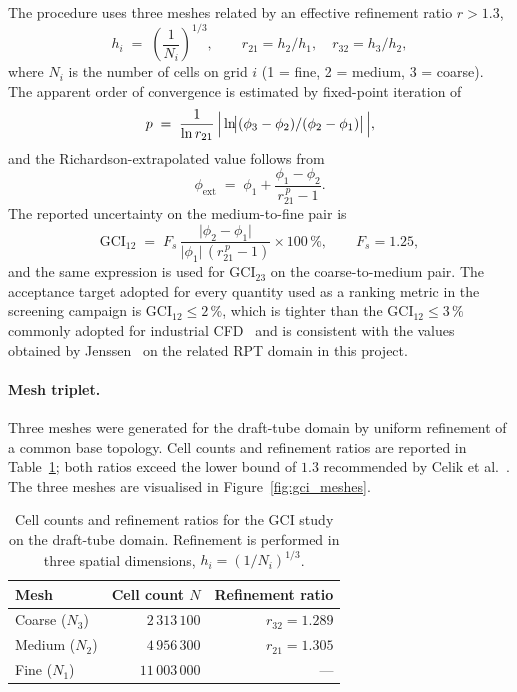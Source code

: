 The procedure uses three meshes related by an effective refinement ratio $r > 1.3$,
\begin{equation}
h_i \;=\; \!\left(\frac{1}{N_i}\right)^{1/3}, \qquad
r_{21} = h_2 / h_1, \quad r_{32} = h_3 / h_2,
\label{eq:GCI_h_r}
\end{equation}
where $N_i$ is the number of cells on grid $i$ (1 = fine, 2 = medium, 3 = coarse). The apparent order of convergence is estimated by fixed-point iteration of
\begin{equation}
p \;=\; \frac{1}{\ln r_{21}} \,\Bigl|\,\ln\!\bigl|(\phi_3 - \phi_2)/(\phi_2 - \phi_1)\bigr|\,\Bigr|,
\label{eq:GCI_p}
\end{equation}
and the Richardson-extrapolated value follows from
\begin{equation}
\phi_{\mathrm{ext}} \;=\; \phi_1 + \frac{\phi_1 - \phi_2}{r_{21}^{\,p} - 1}.
\label{eq:GCI_extrap}
\end{equation}
The reported uncertainty on the medium-to-fine pair is
\begin{equation}
\mathrm{GCI}_{12} \;=\; F_s\,\frac{\bigl|\phi_2 - \phi_1\bigr|}{\bigl|\phi_1\bigr|\,(r_{21}^{\,p} - 1)} \times 100\,\%, \qquad F_s = 1.25,
\label{eq:GCI_def}
\end{equation}
and the same expression is used for $\mathrm{GCI}_{23}$ on the coarse-to-medium pair. The acceptance target adopted for every quantity used as a ranking metric in the screening campaign is $\mathrm{GCI}_{12} \leq 2\,\%$, which is tighter than the $\mathrm{GCI}_{12} \leq 3\,\%$ commonly adopted for industrial CFD~\cite{Celik2008} and is consistent with the values obtained by Jenssen~\cite{Jenssen2020} on the related RPT domain in this project.

\paragraph{Mesh triplet.}
Three meshes were generated for the draft-tube domain by uniform refinement of a common base topology. Cell counts and refinement ratios are reported in Table~\ref{tab:gci_meshes}; both ratios exceed the lower bound of $1.3$ recommended by Celik et al.~\cite{Celik2008}. The three meshes are visualised in Figure~\ref{fig:gci_meshes}.

\begin{table}[h!]
  \centering
  \caption[Mesh triplet for the GCI study]{Cell counts and refinement ratios for the GCI study on the draft-tube domain. Refinement is performed in three spatial dimensions, $h_i = (1/N_i)^{1/3}$.}
  \label{tab:gci_meshes}
  \small
  \begin{tabular}{l r r}
    \toprule
    \textbf{Mesh}  & \textbf{Cell count $N$}  & \textbf{Refinement ratio} \\
    \midrule
    Coarse ($N_3$) & $2\,313\,100$            & $r_{32} = 1.289$ \\
    Medium ($N_2$) & $4\,956\,300$            & $r_{21} = 1.305$ \\
    Fine   ($N_1$) & $11\,003\,000$           & --- \\
    \bottomrule
  \end{tabular}
\end{table}

